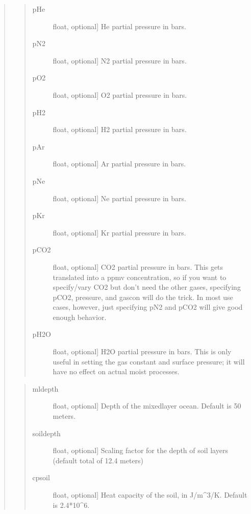 \documentclass[letterpaper,10pt,english]{sphinxmanual}
\begin{document}
\begin{fulllineitems}
\begin{fulllineitems}
\begin{quote}
\begin{quote}
\begin{description}
\item[{pHe}] \leavevmode{[}float, optional{]}
He partial pressure in bars.

\item[{pN2}] \leavevmode{[}float, optional{]}
N2 partial pressure in bars.

\item[{pO2}] \leavevmode{[}float, optional{]}
O2 partial pressure in bars.

\item[{pH2}] \leavevmode{[}float, optional{]}
H2 partial pressure in bars.

\item[{pAr}] \leavevmode{[}float, optional{]}
Ar partial pressure in bars.

\item[{pNe}] \leavevmode{[}float, optional{]}
Ne partial pressure in bars.

\item[{pKr}] \leavevmode{[}float, optional{]}
Kr partial pressure in bars.

\item[{pCO2}] \leavevmode{[}float, optional{]}
CO2 partial pressure in bars. This gets translated into a ppmv concentration, so if you want to specify/vary CO2 but don’t need the other gases, specifying pCO2, pressure, and gascon will do the trick. In most use cases, however, just specifying pN2 and pCO2 will give good enough behavior.

\item[{pH2O}] \leavevmode{[}float, optional{]}
H2O partial pressure in bars. This is only useful in setting the gas constant and surface pressure; it will have no effect on actual moist processes.

\end{description}
\end{quote}

\begin{quote}
\begin{description}
\item[{mldepth}] \leavevmode{[}float, optional{]}
Depth of the mixed\sphinxhyphen{}layer ocean. Default is 50 meters.

\item[{soildepth}] \leavevmode{[}float, optional{]}
Scaling factor for the depth of soil layers (default total of 12.4 meters)

\item[{cpsoil}] \leavevmode{[}float, optional{]}
Heat capacity of the soil, in J/m\textasciicircum{}3/K. Default is 2.4*10\textasciicircum{}6.


\end{description}
\end{quote}
\end{quote}
\end{fulllineitems}
\end{fulllineitems}
\end{document}
